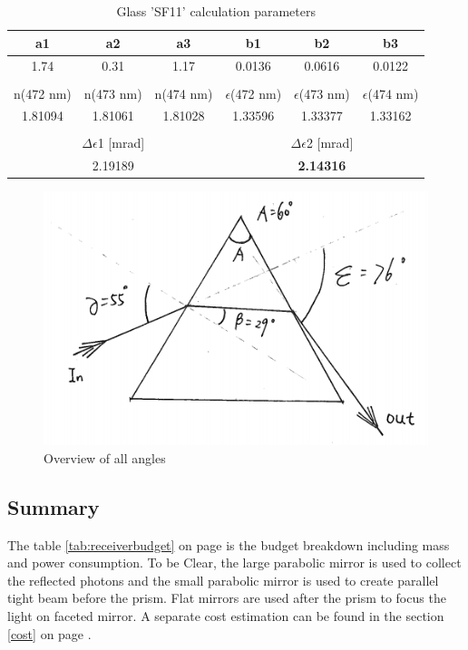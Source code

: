 \begin{table}[ht!]
\centering
\begin{tabular}{ccc|ccc}
  a1 & a2 & a3 & b1 & b2 & b3 \\\hline
  1.74 & 0.31 & 1.17 & 0.0136 & 0.0616 & 0.0122 \\\\
  n(472 nm) & n(473 nm) & n(474 nm) & $\epsilon$(472 nm) & $\epsilon$(473 nm) & $\epsilon$(474 nm) \\\hline 
  1.81094 & 1.81061 & 1.81028 & 1.33596 & 1.33377 & 1.33162 \\\\
   \multicolumn{3}{c|}{$\Delta\epsilon$1 [mrad]} & \multicolumn{3}{c}{$\Delta\epsilon$2 [mrad]}\\\hline
  \multicolumn{3}{c|}{2.19189} & \multicolumn{3}{c}{\textbf{2.14316}} 
 \end{tabular}
\caption{Glass 'SF11' calculation parameters}
\label{tab:MB}
\end{table}
\begin{figure}[ht!]
\centering
\includegraphics[scale = 0.8]{chapters/img/prism_final.png}
\caption{Overview of all angles}
\label{fig:prism_final}
\end{figure}

\subsection{Summary}
\label{sum}
The table \ref{tab:receiverbudget} on page \pageref{tab:receiverbudget} is the budget breakdown including mass and power consumption. To be Clear, the large parabolic mirror is used to collect the reflected photons and the small parabolic mirror is used to create parallel tight beam before the prism. Flat mirrors are used after the prism to focus the light on faceted mirror. A separate cost estimation can be found in the section \ref{cost} on page \pageref{cost}.

